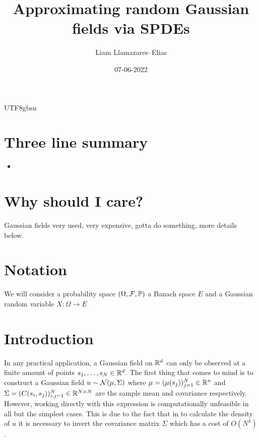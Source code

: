 \documentclass[12pt]{article}
\begin{document}
\begin{CJK*}{UTF8}{gbsn}
	\title{Approximating random Gaussian fields via SPDEs}
	\author{Liam Llamazares--Elias}
	\date{07-06-2022}
	\maketitle
	\section{ Three line summary}
	\begin{itemize}
		\item
	\end{itemize}
	\section{Why should I care?}
	Gaussian fields very used, very expensive, gotta do something, more details below.
	\section{Notation}
	We will consider a probability space $(\Omega,\mathcal{F},\mathbb{P})$ a Banach space $E$ and a Gaussian random variable  $X:\Omega\to E$
	\section{Introduction}
	In any practical application, a Gaussian field on ${\mathbb R}^d$ can only be observed at a finite amount of points $s_1,\ldots,s_N\in {\mathbb R}^d$. The first thing that comes to mind is to construct a Gaussian field $u\sim \mathcal{N}(\mu ,\Sigma)$ where $\mu =(\mu(s_j))_{j=1}^N \in {\mathbb R}^n$ and $\Sigma=(C(s_i,s_j))_{i,j=1}^N \in {\mathbb R}^{N\times N}$ are the sample mean and covariance respectively.	 However, working directly with this expression is computationally unfeasible in all but the simplest cases. This is due to the fact that in to calculate the density of $u$ it is necessary to invert the  covariance matrix $\Sigma $ which has a cost of $O(N^3)$.

\end{CJK*}
\end{document}
